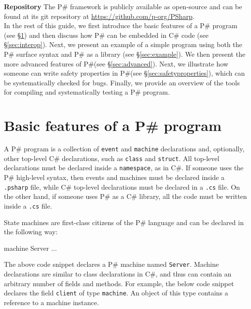 \documentclass{llncs}
\newcommand{\ps}{P\#\xspace}
\newcommand{\cs}{C\#\xspace}
\newcommand{\newparagraph}[1]{\smallskip\noindent\textbf{#1 }}
\begin{document}
\newparagraph{Repository} The \ps framework is publicly available as open-source and can be found at its git repository at \textcolor{blue}{\url{https://github.com/p-org/PSharp}}.\\

\noindent
In the rest of this guide, we first introduce the basic features of a \ps program (see \S\ref{sec:basics}) and then discuss how \ps can be embedded in \cs code (see \S\ref{sec:interop}). Next, we present an example of a simple program using both the \ps surface syntax and \ps as a library (see \S\ref{sec:example}). We then present the more advanced features of \ps (see \S\ref{sec:advanced}). Next, we illustrate how someone can write safety properties in \ps (see \S\ref{sec:safetyproperties}), which can be systematically checked for bugs. Finally, we provide an overview of the tools for compiling and systematically testing a \ps program.

\section{Basic features of a \ps program}
\label{sec:basics}

A \ps program is a collection of \texttt{event} and \texttt{machine} declarations and, optionally, other top-level \cs declarations, such as \texttt{class} and \texttt{struct}. All top-level declarations must be declared inside a \texttt{namespace}, as in \cs. If someone uses the \ps high-level syntax, then events and machines must be declared inside a \texttt{.psharp} file, while \cs top-level declarations must be declared in a \texttt{.cs} file. On the other hand, if someone uses \ps as a \cs library, all the code must be written inside a \texttt{.cs} file.

State machines are first-class citizens of the \ps language and can be declared in the following way:

\begin{psharpNoLines}
machine Server { ... }
\end{psharpNoLines}

\noindent
The above code snippet declares a \ps machine named \texttt{Server}. Machine declarations are similar to class declarations in \cs, and thus can contain an arbitrary number of fields and methods. For example, the below code snippet declares the field \texttt{client} of type \texttt{machine}. An object of this type contains a reference to a machine instance.
\end{document}
